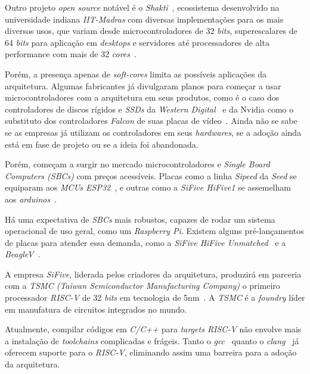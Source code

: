{ Outro projeto \textit{open source} notável é o \textit{Shakti}~\cite{shakti},
    ecossistema desenvolvido na universidade indiana \textit{IIT-Madras} com
    diversas implementações para os mais diversos usos, que variam desde
    microcontroladores de 32 \textit{bits}, superescalares de 64 \textit{bits}
    para aplicação em \textit{desktops} e servidores até processadores de alta
    performance com mais de 32 \textit{cores}~\cite{shakti_types}.
}

{ Porém, a presença apenas de \textit{soft-cores} limita as possíveis aplicações
    da arquitetura. Algumas fabricantes já divulgaram planos para começar a usar
    microcontroladores com a arquitetura em seus produtos, como é o caso dos
    controladores de discos rígidos e \textit{SSDs} da
    \textit{Western Digital}~\cite{western_riscv} e da Nvidia como o substituto
    dos controladores \textit{Falcon} de suas placas de vídeo~\cite{nvidia_riscv}.
    Ainda não se sabe se as empresas já utilizam os controladores em seus
    \textit{hardwares}, se a adoção ainda está em fase de projeto ou se a ideia
    foi abandonada.
}

{ Porém, começam a surgir no mercado microcontroladores e \textit{Single
    Board Computers (SBCs)} com preços acessíveis. Placas como a linha
    \textit{Sipeed} da \textit{Seed} se equiparam aos \textit{MCUs
    ESP32}~\cite{hackaday_sipeed}, e outras como a \textit{SiFive HiFive1}
    se assemelham aos \textit{arduinos}~\cite{hifive_arduino}.
}

{ Há uma expectativa de \textit{SBCs} mais robustos, capazes de rodar um
    sistema operacional de uso geral, como um \textit{Raspberry Pi}. Existem
    alguns pré-lançamentos de placas para atender essa demanda, como a
    \textit{SiFive HiFive Unmatched}~\cite{hifive_unmatched} e a
    \textit{BeagleV}~\cite{beaglev}.
}

{ A empresa \textit{SiFive}, liderada pelos criadores da arquitetura, produzirá
    em parceria com a \textit{TSMC (Taiwan Semiconductor Manufacturing Company)}
    o primeiro processador \textit{RISC-V} de 32 \textit{bits} em tecnologia
    de 5nm~\cite{sifive_tsmc}. A \textit{TSMC} é a \textit{foundry} líder em
    manufatura de circuitos integrados no mundo.
}

{ Atualmente, compilar códigos em \textit{C/C++} para \textit{targets RISC-V}
    não envolve mais a instalação de \textit{toolchains} complicadas e frágeis.
    Tanto o \textit{gcc}~\cite{gcc_riscv} quanto o \textit{clang}~\cite{clang_riscv}
    já oferecem suporte para o \textit{RISC-V}, eliminando assim uma barreira
    para a adoção da arquitetura.
}


